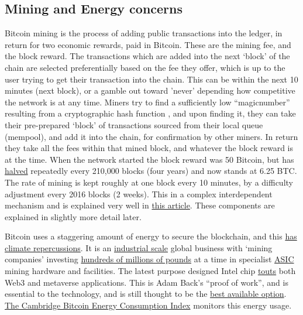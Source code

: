 \subsection{Mining and Energy concerns}
Bitcoin mining is the process of adding public transactions into the ledger, in return for two economic rewards, paid in Bitcoin. These are the mining fee, and the block reward. The transactions which are added into the next `block' of the chain are selected preferentially based on the fee they offer, which is up to the user trying to get their transaction into the chain. This can be within the next 10 minutes (next block), or a gamble out toward 'never' depending how competitive the network is at any time. Miners try to find a sufficiently low ``magicnumber'' resulting from a cryptographic hash function \cite{rogaway2004cryptographic}, and upon finding it, they can take their pre-prepared `block' of transactions sourced from their local queue (mempool), and add it into the chain, for confirmation by other miners. In return they take all the fees within that mined block, and whatever the block reward is at the time. When the network started the block reward was 50 Bitcoin, but has \href{https://ma.ttias.be/dissecting-code-bitcoin-halving/}{halved} repeatedly every 210,000 blocks (four years) and now stands at 6.25 BTC. The rate of mining is kept roughly at one block every 10 minutes, by a difficulty adjustment every 2016 blocks (2 weeks). This in a complex interdependent mechanism and is explained very well in \href{https://bitcoinmagazine.com/technical/how-mining-protects-the-bitcoin-network}{this article}. These components are explained in slightly more detail later.\par
Bitcoin uses a staggering amount of energy to secure the blockchain, and this \href{https://www.edmundconway.com/bitcoin-money-and-the-planet/}{has climate repercussions}. It is an \href{https://www.ruetir.com/2022/03/18/riot-whinstone-the-bitcoin-farm-with-100000-computers-that-uses-excess-energy-from-an-oil-platform-to-mine-cryptocurrencies-ruetir/}{industrial scale} global business with `mining companies' investing \href{https://ir.marathondh.com/news-events/press-releases/detail/1272/marathon-digital-holdings-bitcoin-mining-fleet-to-reach}{hundreds of millions of pounds} at a time in specialist \href{https://en.wikipedia.org/wiki/Application-specific_integrated_circuit}{ASIC} mining hardware and facilities. The latest purpose designed Intel chip \href{https://www.intel.com/content/www/us/en/newsroom/opinion/thoughts-blockchain-custom-compute-group.html#gs.pd9ofu}{touts} both Web3 and metaverse applications. This is Adam Back's ``proof of work'',  and is essential to the technology, and is still thought to be the \href{https://www.truthcoin.info/blog/pow-cheapest/}{best available option}. \href{https://ccaf.io/cbeci/index}{The Cambridge Bitcoin Energy Consumption Index} monitors this energy usage.\par
